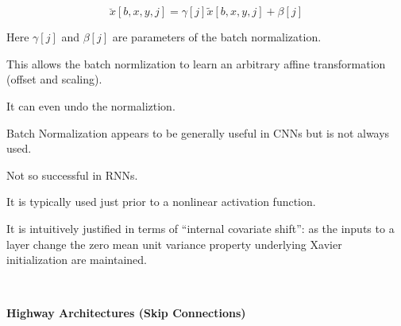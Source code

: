 {$$\breve{x}[b,x,y,j] = \gamma[j] \tilde{x}[b,x,y,j] + \beta[j]$$

\vfill
Here $\gamma[j]$ and $\beta[j]$ are parameters of the batch normalization.

\vfill
This allows the batch normlization to learn an arbitrary affine transformation (offset and scaling).

\vfill
It can even undo the normaliztion.


Batch Normalization appears to be generally useful in CNNs but is not always used.

\vfill
Not so successful in RNNs.

\vfill
It is typically used just prior to a nonlinear activation function.

\vfill
It is intuitively justified in terms of ``internal covariate shift'':
as the inputs to a layer change the zero mean unit variance property underlying Xavier initialization are maintained.


\vfill
\eject
~ \vfill
\centerline{\bf Highway Architectures (Skip Connections)}
\vfill
\vfill


}
